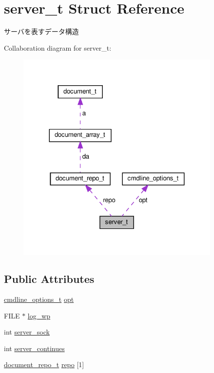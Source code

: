 \hypertarget{structserver__t}{}\section{server\+\_\+t Struct Reference}
\label{structserver__t}


サーバを表すデータ構造  




Collaboration diagram for server\+\_\+t\+:\nopagebreak
\begin{figure}[H]
\begin{center}
\leavevmode
\includegraphics[width=287pt]{structserver__t__coll__graph}
\end{center}
\end{figure}
\subsection*{Public Attributes}
\begin{DoxyCompactItemize}
\item 
\hyperlink{structcmdline__options__t}{cmdline\+\_\+options\+\_\+t} \hyperlink{structserver__t_ab30d7fd534185bb41598981e1179ef61}{opt}
\item 
F\+I\+LE $\ast$ \hyperlink{structserver__t_a75cbeb1e7d454b344ac0d0b92b83d791}{log\+\_\+wp}
\item 
int \hyperlink{structserver__t_aa00bd4dd0cc9961993afa944f953b321}{server\+\_\+sock}
\item 
int \hyperlink{structserver__t_a4ad89f525db2c7f5f33e29a2413754d8}{server\+\_\+continues}
\item 
\hyperlink{structdocument__repo__t}{document\+\_\+repo\+\_\+t} \hyperlink{structserver__t_a457cf4a9e24ffd5013da271faa23e790}{repo} \mbox{[}1\mbox{]}
\end{DoxyCompactItemize}


